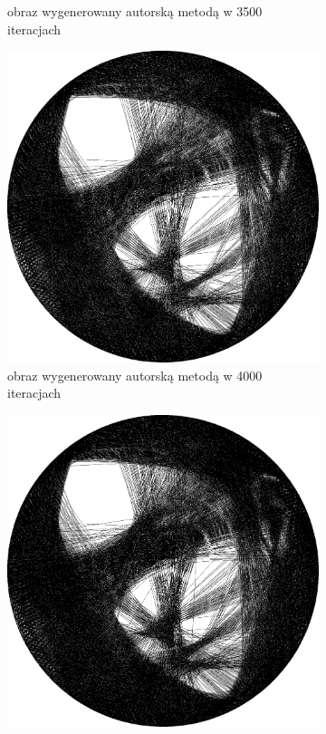 \begin{figure}[H]
\begin{subfigure}{0.24\textwidth}
        \caption{obraz wygenerowany autorską metodą w 3500 iteracjach}
        \label{comp-comp-magdalene-m}
    \end{subfigure}
    \begin{subfigure}{0.24\textwidth}
        \centering
        \includegraphics[width = \textwidth]{img/6-comp/magdalene_e_i4000_c20_inv0_bg10_obj1_ed1.png}
        \caption{obraz wygenerowany autorską metodą w 4000 iteracjach}
        \label{comp-comp-magdalene-n}
    \end{subfigure}
    \begin{subfigure}{0.24\textwidth}
        \centering
        \includegraphics[width = \textwidth]{img/6-comp/magdalene_e_i4500_c20_inv0_bg10_obj1_ed1.png}

\end{subfigure}
\end{figure}
